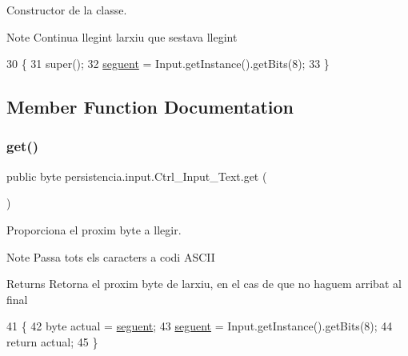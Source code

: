 Constructor de la classe. 

\begin{DoxyNote}{Note}
Continua llegint l\textquotesingle{}arxiu que s\textquotesingle{}estava llegint 
\end{DoxyNote}

\begin{DoxyCode}
30                              \{
31         super();
32         \hyperlink{classpersistencia_1_1input_1_1Ctrl__Input__Text_a533e9e0497774114b57d8dd5a6bbb000}{seguent} = Input.getInstance().getBits(8);
33     \}
\end{DoxyCode}


\subsection{Member Function Documentation}
\mbox{\label{classpersistencia_1_1input_1_1Ctrl__Input__Text_a8b501ae723f8c6f8d63305a56e9720c3}} 
\subsubsection{\texorpdfstring{get()}{get()}}
{\footnotesize\ttfamily public byte persistencia.\+input.\+Ctrl\+\_\+\+Input\+\_\+\+Text.\+get (\begin{DoxyParamCaption}{ }\end{DoxyParamCaption})\hspace{0.3cm}{\ttfamily [inline]}}



Proporciona el proxim byte a llegir. 

\begin{DoxyNote}{Note}
Passa tots els caracters a codi A\+S\+C\+II 
\end{DoxyNote}
\begin{DoxyReturn}{Returns}
Retorna el proxim byte de l\textquotesingle{}arxiu, en el cas de que no haguem arribat al final 
\end{DoxyReturn}

\begin{DoxyCode}
41                       \{
42         byte actual = \hyperlink{classpersistencia_1_1input_1_1Ctrl__Input__Text_a533e9e0497774114b57d8dd5a6bbb000}{seguent};
43         \hyperlink{classpersistencia_1_1input_1_1Ctrl__Input__Text_a533e9e0497774114b57d8dd5a6bbb000}{seguent} = Input.getInstance().getBits(8); 
44         \textcolor{keywordflow}{return} actual;
45     \}
\end{DoxyCode}



